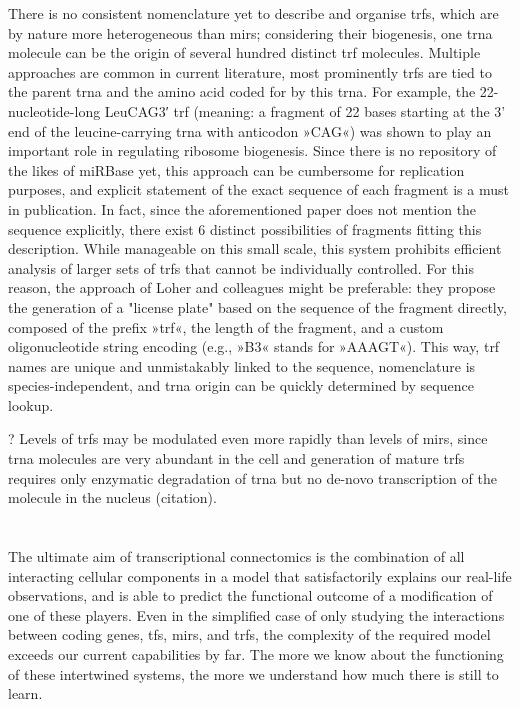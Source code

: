 There is no consistent nomenclature yet to describe and organise \acp{trf}, which are by nature more heterogeneous than \acp{mir}; considering their biogenesis, one \ac{trna} molecule can be the origin of several hundred distinct \ac{trf} molecules. Multiple approaches are common in current literature, most prominently \acp{trf} are tied to the parent \ac{trna} and the amino acid coded for by this \ac{trna}. For example, the 22-nucleotide-long LeuCAG3′ \ac{trf} (meaning: a fragment of 22 bases starting at the 3' end of the leucine-carrying \ac{trna} with anticodon »CAG«) was shown to play an important role in regulating ribosome biogenesis\cite{Kim2017}. Since there is no repository of the likes of miRBase yet, this approach can be cumbersome for replication purposes, and explicit statement of the exact sequence of each fragment is a must in publication. In fact, since the aforementioned paper does not mention the sequence explicitly, there exist 6 distinct possibilities of fragments fitting this description. While manageable on this small scale, this system prohibits efficient analysis of larger sets of \acp{trf} that cannot be individually controlled. For this reason, the approach of Loher and colleagues\cite{Loher2017} might be preferable: they propose the generation of a "license plate" based on the sequence of the fragment directly, composed of the prefix »\ac{trf}«, the length of the fragment, and a custom oligonucleotide string encoding (e.g., »B3« stands for »AAAGT«). This way, \ac{trf} names are unique and unmistakably linked to the sequence, nomenclature is species-independent, and \ac{trna} origin can be quickly determined by sequence lookup.


? Levels of \acp{trf} may be modulated even more rapidly than levels of \acp{mir}, since \ac{trna} molecules are very abundant in the cell and generation of mature \acp{trf} requires only enzymatic degradation of \ac{trna} but no de-novo transcription of the molecule in the nucleus (citation).

\section[Nested Multimodal Transcriptional Interactions - The Need for Connectomics]{}
The ultimate aim of transcriptional connectomics is the combination of all interacting cellular components in a model that satisfactorily explains our real-life observations, and is able to predict the functional outcome of a modification of one of these players. Even in the simplified case of only studying the interactions between coding genes, \acp{tf}, \acp{mir}, and \acp{trf}, the complexity of the required model exceeds our current capabilities by far. The more we know about the functioning of these intertwined systems, the more we understand how much there is still to learn. 


